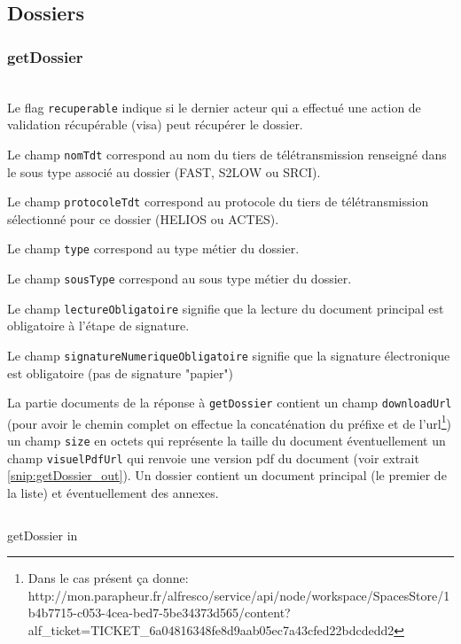 \subsection{Dossiers}

\subsubsection{getDossier}
\\


Le flag \verb|recuperable| indique si le dernier acteur qui a effectué une action de validation récupérable (visa) peut récupérer le dossier.

Le champ \verb|nomTdt| correspond au nom du tiers de télétransmission renseigné dans le sous type associé au dossier (FAST, S2LOW ou SRCI).

Le champ \verb|protocoleTdt| correspond au protocole du tiers de télétransmission sélectionné pour ce dossier (HELIOS ou ACTES).

Le champ \verb|type| correspond au type métier du dossier.

Le champ \verb|sousType| correspond au sous type métier du dossier.

Le champ \verb|lectureObligatoire| signifie que la lecture du document principal est obligatoire à l'étape de signature.

Le champ \verb|signatureNumeriqueObligatoire| signifie que la signature électronique est obligatoire (pas de signature "papier")

La partie documents de la réponse à \verb|getDossier| contient un champ \verb|downloadUrl| (pour avoir le chemin complet on effectue la concaténation du préfixe et de l'url\footnote{Dans le cas présent ça donne: http://mon.parapheur.fr/alfresco/service/api/node/workspace/SpacesStore/1b4b7715-c053-4cea-bed7-5be34373d565/content?alf\_ticket=TICKET\_6a04816348fe8d9aab05ec7a43cfed22bdcdedd2}) un champ \verb|size| en octets qui représente la taille du document éventuellement un champ \verb|visuelPdfUrl| qui renvoie une version pdf du document (voir extrait \ref{snip:getDossier_out}). Un dossier contient un document principal (le premier de la liste) et éventuellement des annexes.

\begin{codesnippet}
\inputminted[frame=single,linenos,fontsize=\footnotesize]{javascript}{extraits/getDossier_in.js}
\caption{getDossier in}
\label{snip:getDossier_out}
\end{codesnippet}

